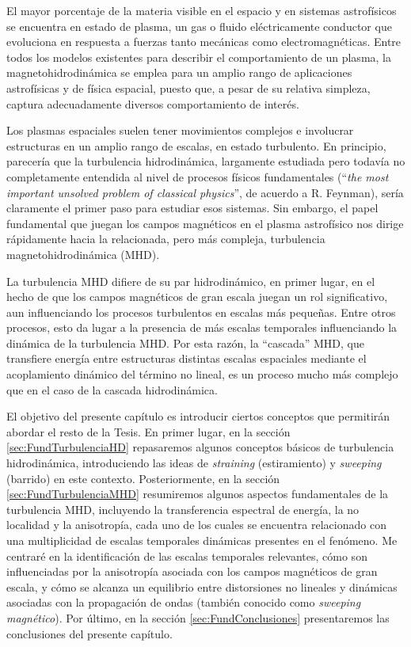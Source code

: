 El mayor porcentaje de la materia visible en el espacio y en sistemas
astrofísicos se encuentra en estado de plasma, un gas o fluido
eléctricamente conductor que evoluciona en respuesta a fuerzas tanto
mecánicas como electromagnéticas. Entre todos los modelos existentes
para describir el comportamiento de un plasma, la magnetohidrodinámica
se emplea para un amplio rango de aplicaciones astrofísicas y de
física espacial, puesto que, a pesar de su relativa simpleza, captura
adecuadamente diversos comportamiento de interés.

Los plasmas espaciales suelen tener movimientos complejos e involucrar
estructuras en un amplio rango de escalas, en estado turbulento. En
principio, parecería que la turbulencia hidrodinámica, largamente
estudiada pero todavía no completamente entendida al nivel de procesos
físicos fundamentales (``\textit{the most important unsolved problem
of classical physics}'', de acuerdo a R. Feynman), sería claramente el
primer paso para estudiar esos sistemas. Sin embargo, el papel
fundamental que juegan los campos magnéticos en el plasma astrofísico
nos dirige rápidamente hacia la relacionada, pero más compleja,
turbulencia magnetohidrodinámica (MHD).

La turbulencia MHD difiere de su par hidrodinámico, en primer lugar,
en el hecho de que los campos magnéticos de gran escala juegan un rol
significativo, aun influenciando los procesos turbulentos en escalas
más pequeñas. Entre otros procesos, esto da lugar a la presencia de
más escalas temporales influenciando la dinámica de la turbulencia
MHD. Por esta razón, la ``cascada'' MHD, que transfiere energía entre
estructuras distintas escalas espaciales mediante el acoplamiento
dinámico del término no lineal, es un proceso mucho más complejo que
en el caso de la cascada hidrodinámica.

El objetivo del presente capítulo es introducir ciertos conceptos que
permitirán abordar el resto de la Tesis. En primer lugar, en la sección
\ref{sec:FundTurbulenciaHD} repasaremos algunos conceptos básicos de
turbulencia hidrodinámica, introduciendo las ideas de
\textit{straining} (estiramiento) y \textit{sweeping} (barrido) en
este contexto. Posteriormente, en la
sección \ref{sec:FundTurbulenciaMHD} resumiremos algunos aspectos
fundamentales de la turbulencia MHD, incluyendo la transferencia
espectral de energía, la no localidad y la anisotropía, cada uno de
los cuales se encuentra relacionado con una multiplicidad de escalas
temporales dinámicas presentes en el fenómeno.  Me centraré en la
identificación de las escalas temporales relevantes, cómo son
influenciadas por la anisotropía asociada con los campos magnéticos de
gran escala, y cómo se alcanza un equilibrio entre distorsiones no
lineales y dinámicas asociadas con la propagación de ondas (también
conocido como \textit{sweeping magnético}).  Por último, en la
sección \ref{sec:FundConclusiones} presentaremos las conclusiones del
presente capítulo.



